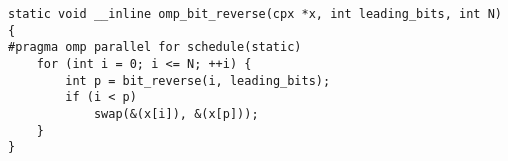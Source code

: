 \lstset{language=C++}
\begin{lstlisting}
static void __inline omp_bit_reverse(cpx *x, int leading_bits, int N)
{
#pragma omp parallel for schedule(static)
    for (int i = 0; i <= N; ++i) {
        int p = bit_reverse(i, leading_bits);
        if (i < p)
            swap(&(x[i]), &(x[p]));
    }
}
\end{lstlisting}
